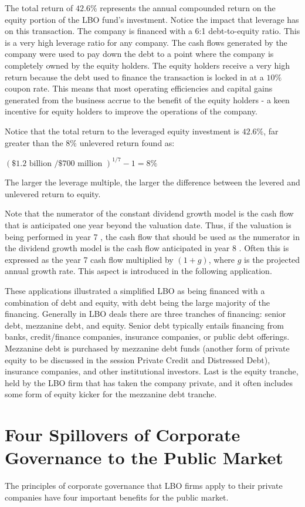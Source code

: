 \documentclass[11pt]{article}
\begin{document}
The total return of $42.6 \%$ represents the annual compounded return on the equity portion of the LBO fund's investment. Notice the impact that leverage has on this transaction. The company is financed with a 6:1 debt-to-equity ratio. This is a very high leverage ratio for any company. The cash flows generated by the company were used to pay down the debt to a point where the company is completely owned by the equity holders. The equity holders receive a very high return because the debt used to finance the transaction is locked in at a $10 \%$ coupon rate. This means that most operating efficiencies and capital gains generated from the business accrue to the benefit of the equity holders - a keen incentive for equity holders to improve the operations of the company.

Notice that the total return to the leveraged equity investment is $42.6 \%$, far greater than the $8 \%$ unlevered return found as:

$(\$ 1.2 \text { billion } / \$ 700 \text { million })^{1 / 7}-1=8 \%$

The larger the leverage multiple, the larger the difference between the levered and unlevered return to equity.

Note that the numerator of the constant dividend growth model is the cash flow that is anticipated one year beyond the valuation date. Thus, if the valuation is being performed in year 7 , the cash flow that should be used as the numerator in the dividend growth model is the cash flow anticipated in year 8 . Often this is expressed as the year 7 cash flow multiplied by $(1+g)$, where $g$ is the projected annual growth rate. This aspect is introduced in the following application.

These applications illustrated a simplified LBO as being financed with a combination of debt and equity, with debt being the large majority of the financing. Generally in LBO deals there are three tranches of financing: senior debt, mezzanine debt, and equity. Senior debt typically entails financing from banks, credit/finance companies, insurance companies, or public debt offerings. Mezzanine debt is purchased by mezzanine debt funds (another form of private equity to be discussed in the session Private Credit and Distressed Debt), insurance companies, and other institutional investors. Last is the equity tranche, held by the LBO firm that has taken the company private, and it often includes some form of equity kicker for the mezzanine debt tranche.

\section*{Four Spillovers of Corporate Governance to the Public Market}
The principles of corporate governance that LBO firms apply to their private companies have four important benefits for the public market.
\end{document}
